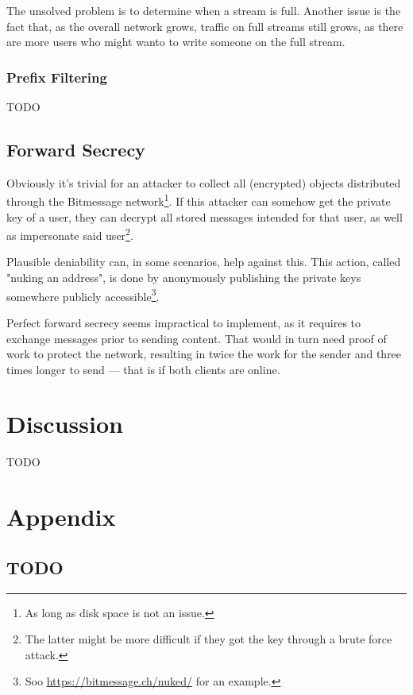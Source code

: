 \documentclass{bfh}
\begin{document}
  The unsolved problem is to determine when a stream is full. Another issue is the fact that, as the overall network grows, traffic on full streams still grows, as there are more users who might wanto to write someone on the full stream.

  \subsubsection{Prefix Filtering}
  TODO

  \subsection{Forward Secrecy}

  Obviously it's trivial for an attacker to collect all (encrypted) objects distributed through the Bitmessage network\footnote{As long as disk space is not an issue.}. If this attacker can somehow get the private key of a user, they can decrypt all stored messages intended for that user, as well as impersonate said user\footnote{The latter might be more difficult if they got the key through a brute force attack.}.

  Plausible deniability can, in some scenarios, help against this. This action, called "nuking an address", is done by anonymously publishing the private keys somewhere publicly accessible\footnote{Soo \url{https://bitmessage.ch/nuked/} for an example.}.

  Perfect forward secrecy seems impractical to implement, as it requires to exchange messages prior to sending content. That would in turn need proof of work to protect the network, resulting in twice the work for the sender and three times longer to send --- that is if both clients are online.

  \section{Discussion}

  TODO


  
  

  \appendix
  \section*{Appendix}
  \renewcommand{\thesubsection}{\Alph{subsection}}

  \subsection{TODO}
\end{document}
